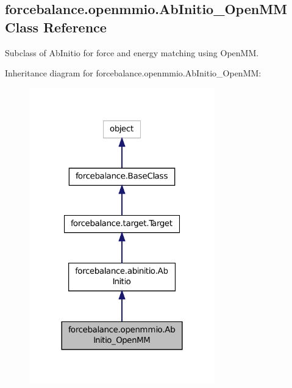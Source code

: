 \hypertarget{classforcebalance_1_1openmmio_1_1AbInitio__OpenMM}{\subsection{forcebalance.\-openmmio.\-Ab\-Initio\-\_\-\-Open\-M\-M Class Reference}
\label{classforcebalance_1_1openmmio_1_1AbInitio__OpenMM}
}


Subclass of Ab\-Initio for force and energy matching using Open\-M\-M.  




Inheritance diagram for forcebalance.\-openmmio.\-Ab\-Initio\-\_\-\-Open\-M\-M\-:\nopagebreak
\begin{figure}[H]
\begin{center}
\leavevmode
\includegraphics[width=228pt]{classforcebalance_1_1openmmio_1_1AbInitio__OpenMM__inherit__graph}
\end{center}
\end{figure}


